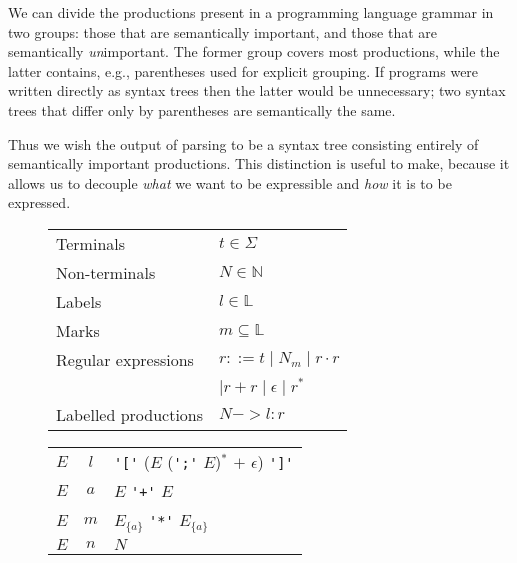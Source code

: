\documentclass[acmsmall,review,anonymous]{acmart}\settopmatter{printfolios=true,printccs=false,printacmref=false}
\newcommand{\NT}{\mathbb{N}} %
\newcommand{\T}{\Sigma} %
\newcommand{\Labels}{\mathbb{L}} %
\begin{document}
We can divide the productions present in a programming language grammar in two groups: those that are semantically important, and those that are semantically \emph{un}important. The former group covers most productions, while the latter contains, e.g., parentheses used for explicit grouping. If programs were written directly as syntax trees then the latter would be unnecessary; two syntax trees that differ only by parentheses are semantically the same.

Thus we wish the output of parsing to be a syntax tree consisting entirely of semantically important productions. This distinction is useful to make, because it allows us to decouple \emph{what} we want to be expressible and \emph{how} it is to be expressed.

\begin{figure}
\centering
\begin{minipage}{.47\textwidth}
  \centering
  \begin{tabular}{@{}ll@{}}
      Terminals & $t \in \T$ \\
      Non-terminals & $N \in \NT$ \\
      Labels & $l \in \Labels$ \\
      Marks & $m \subseteq \Labels$ \\
      Regular expressions & $r ::= t \mid N_m \mid r \cdot r $ \\
      & \hphantom{$r ::=$}$\mid r + r \mid \epsilon \mid r^{*}$ \\
      Labelled productions & $N -> l : r$ \\
  \end{tabular}
  \label{fig:input-language-definition}
\end{minipage}\quad
\begin{minipage}{.45\textwidth}
  \centering
  \begin{tabular}{@{}l@{\quad$->$\quad}c@{ $:$\quad}l@{}}
    $E$ & $l$ & \verb|'['| ($E$ (\verb|';'| $E$)$^{*}$ $+$ $\epsilon$) \verb|']'| \\
    $E$ & $a$ & $E$ \verb|'+'| $E$ \\
    $E$ & $m$ & $E_{\{a\}}$ \verb|'*'| $E_{\{a\}}$ \\
    $E$ & $n$ & $N$ \\
  \end{tabular}
  \label{fig:running-example-definition}
\end{minipage}
\end{figure}
\end{document}
